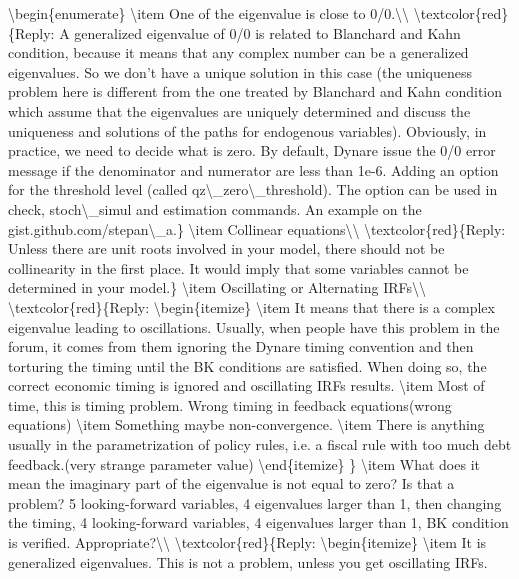 \documentclass[10pt,math=newtx,citestyle=gb7714-2015,bibstyle=gb7714-2015]{elegantbook}
\begin{document}
	\textbackslash{}begin\{enumerate\}
	\textbackslash{}item One of the eigenvalue is close to 0/0.\textbackslash{}\textbackslash{}
	\textbackslash{}textcolor\{red\}\{Reply: A generalized eigenvalue of 0/0 is related to Blanchard and Kahn condition, because it means that any complex number can be a generalized eigenvalues. So we don't have a unique solution in this case (the uniqueness problem here is different from the one treated by Blanchard and Kahn condition which assume that the eigenvalues are uniquely determined and discuss the uniqueness and solutions of the paths for endogenous variables). Obviously, in practice, we need to decide what is zero. By default, Dynare issue the 0/0 error message if the denominator and numerator are less than 1e-6. Adding an option for the threshold level (called qz\textbackslash{}\_zero\textbackslash{}\_threshold). The option can be used in check, stoch\textbackslash{}\_simul and estimation commands. An example on the gist.github.com/stepan\textbackslash{}\_a.\}
	\textbackslash{}item Collinear equations\textbackslash{}\textbackslash{}
	\textbackslash{}textcolor\{red\}\{Reply: Unless there are unit roots involved in your model, there should not be collinearity in the first place. It would imply that some variables cannot be determined in your model.\}
	\textbackslash{}item Oscillating or Alternating IRFs\textbackslash{}\textbackslash{}
	\textbackslash{}textcolor\{red\}\{Reply:
	\textbackslash{}begin\{itemize\}
	\textbackslash{}item It means that there is a complex eigenvalue leading to oscillations. Usually, when people have this problem in the forum, it comes from them ignoring the Dynare timing convention and then torturing the timing until the BK conditions are satisfied. When doing so, the correct economic timing is ignored and oscillating IRFs results.
	\textbackslash{}item Most of time, this is timing problem. Wrong timing in feedback equations(wrong equations)
	\textbackslash{}item Something maybe non-convergence.
	\textbackslash{}item There is anything usually in the parametrization of policy rules, i.e. a fiscal rule with too much debt feedback.(very strange parameter value)
	\textbackslash{}end\{itemize\}
	\}
	\textbackslash{}item What does it mean the imaginary part of the eigenvalue is not equal to zero? Is that a problem? 5 looking-forward variables, 4 eigenvalues larger than 1, then changing the timing, 4 looking-forward variables, 4 eigenvalues larger than 1, BK condition is verified. Appropriate?\textbackslash{}\textbackslash{}
	\textbackslash{}textcolor\{red\}\{Reply:
	\textbackslash{}begin\{itemize\}
	\textbackslash{}item It is generalized eigenvalues. This is not a problem, unless you get oscillating IRFs.
\end{document}
